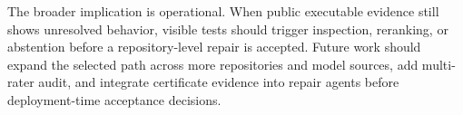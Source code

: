 \documentclass[conference]{IEEEtran}
\begin{document}
The broader implication is operational.
When public executable evidence still shows unresolved behavior, visible tests should trigger inspection, reranking, or abstention before a repository-level repair is accepted.
Future work should expand the selected path across more repositories and model sources, add multi-rater audit, and integrate certificate evidence into repair agents before deployment-time acceptance decisions.


\end{document}
